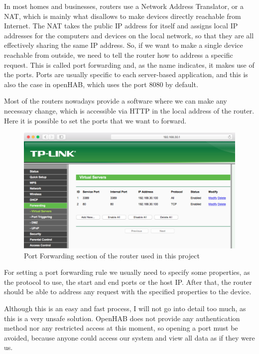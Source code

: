 In most homes and businesses, routers use a Network Address Translator, or a NAT, which is mainly what disallows to make devices
directly reachable from Internet. The NAT takes the public IP address for itself and assigns local IP addresses for the computers
and devices on the local network, so that they are all effectively sharing the same IP address. So, if we want to make a single
device reachable from outside, we need to tell the router how to address a specific request. This is called port forwarding and,
as the name indicates, it makes use of the ports. Ports are usually specific to each server-based application, and this is also the
case in openHAB, which uses the port 8080 by default.

Most of the routers nowadays provide a software where we can make any necessary change, which is accessible via HTTP in the local
address of the router. Here it is possible to set the ports that we want to forward.

\begin{figure}
	\centering
	\includegraphics[width=1\textwidth]{images/Chapter_06/port-forwarding.png}
	\caption{Port Forwarding section of the router used in this project}
	\label{fig:port-forwarding}
\end{figure}

For setting a port forwarding rule we usually need to specify some properties, as the protocol to use, the start and end ports or
the host IP. After that, the router should be able to address any request with the specified properties to the device.

Although this is an easy and fast process, I will not go into detail too much, as this is a very unsafe solution. OpenHAB does
not provide any authentication method nor any restricted access at this moment, so opening a port must be avoided, because anyone
could access our system and view all data as if they were us.

